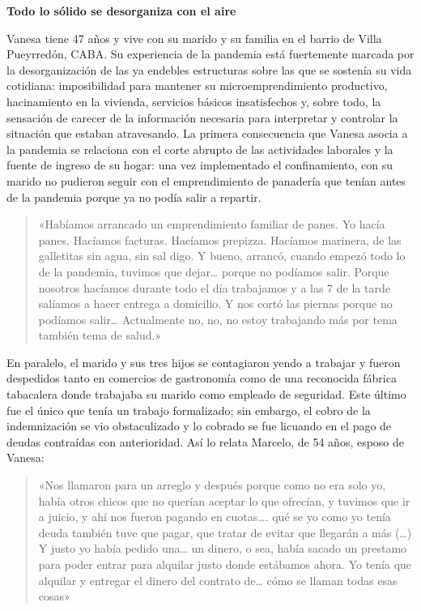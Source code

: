 \textbf{Todo lo sólido se desorganiza con el aire}

Vanesa tiene 47 años y vive con su marido y su familia en el barrio de Villa Pueyrredón, CABA. Su experiencia de la pandemia está fuertemente marcada por la desorganización de las ya endebles estructuras sobre las que se sostenía su vida cotidiana: imposibilidad para mantener su microemprendimiento productivo, hacinamiento en la vivienda, servicios básicos insatisfechos y, sobre todo, la sensación de carecer de la información necesaria para interpretar y controlar la situación que estaban atravesando. La primera consecuencia que Vanesa asocia a la pandemia se relaciona con el corte abrupto de las actividades laborales y la fuente de ingreso de su hogar: una vez implementado el confinamiento, con su marido no pudieron seguir con el emprendimiento de panadería que tenían antes de la pandemia porque ya no podía salir a repartir.

\begin{quote}
«Habíamos arrancado un emprendimiento familiar de panes. Yo hacía panes. Hacíamos facturas. Hacíamos prepizza. Hacíamos marinera, de las galletitas sin agua, sin sal digo. Y bueno, arrancó, cuando empezó todo lo de la pandemia, tuvimos que dejar\ldots{} porque no podíamos salir. Porque nosotros hacíamos durante todo el día trabajamos y a las 7 de la tarde salíamos a hacer entrega a domicilio. Y nos cortó las piernas porque no podíamos salir\ldots{} Actualmente no, no, no estoy trabajando más por tema también tema de salud.»
\end{quote}

En paralelo, el marido y sus tres hijos se contagiaron yendo a trabajar y fueron despedidos tanto en comercios de gastronomía como de una reconocida fábrica tabacalera donde trabajaba su marido como empleado de seguridad. Este último fue el único que tenía un trabajo formalizado; sin embargo, el cobro de la indemnización se vio obstaculizado y lo cobrado se fue licuando en el pago de deudas contraídas con anterioridad. Así lo relata Marcelo, de 54 años, esposo de Vanesa:

\begin{quote}
«Nos llamaron para un arreglo y después porque como no era solo yo, había otros chicos que no querían aceptar lo que ofrecían, y tuvimos que ir a juicio, y ahí nos fueron pagando en cuotas\ldots. qué se yo como yo tenía deuda también tuve que pagar, que tratar de evitar que llegarán a más (\ldots) Y justo yo había pedido una\ldots{} un dinero, o sea, había sacado un prestamo para poder entrar para alquilar justo donde estábamos ahora. Yo tenía que alquilar y entregar el dinero del contrato de\ldots{} cómo se llaman todas esas cosas»
\end{quote}

